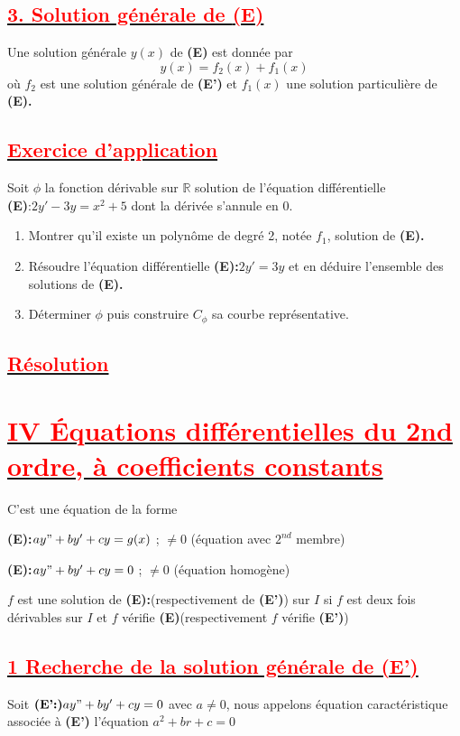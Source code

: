 \documentclass[12pt]{article}
\begin{document}
\subsection*{\underline{\textbf{\textcolor{red}{3. Solution générale de \textbf{(E)}}}}}
Une solution générale $y(x)$ de \textbf{(E)} est donnée par \[y(x)=f_{2}(x)+f_{1}(x)\] où $f_{2}$ est une solution générale de \textbf{(E')} et $f_{1}(x)$ une solution particulière de \textbf{(E).}
\subsection*{\underline{\textbf{\textcolor{red}{Exercice d'application}}}}
Soit $\phi$ la fonction dérivable sur $\mathbb{R}$ solution de l'équation différentielle\\
\textbf{(E)}:$2y'-3y=x^{2}+5$ dont la dérivée s'annule en 0.
\begin{enumerate}
    \item Montrer qu'il existe un polynôme de degré 2, notée $f_{1}$, solution de \textbf{(E).}
    \item Résoudre l'équation différentielle \textbf{(E):}$2y'=3y$ et en déduire l'ensemble des solutions de \textbf{(E).}
    \item Déterminer $\phi$ puis construire $C_{\phi}$ sa courbe représentative. 
\end{enumerate}
\subsection*{\underline{\textbf{\textcolor{red}{Résolution }}}}

\section*{\underline{\textbf{\textcolor{red}{IV Équations différentielles du 2nd ordre, à coefficients constants}}}}
C'est une équation de la forme

\textbf{(E):}$ay"+by'+cy=g(x)$ ; $\neq 0$ (équation avec $2^{nd}$ membre)

\textbf{(E):}$ay"+by'+cy=0$ ; $\neq 0$ (équation homogène)

$f$ est une solution de \textbf{(E):}(respectivement de \textbf{(E')}) sur $I$ si $f$ est deux fois dérivables sur $I$ et $f$ vérifie \textbf{(E)}(respectivement $f$ vérifie \textbf{(E')})
\subsection*{\underline{\textbf{\textcolor{red}{1 Recherche de la solution générale de (E')}}}}
Soit $\textbf{(E':)}ay"+by'+cy=0$ avec $a\neq 0$, nous appelons équation caractéristique associée à \textbf{(E')} l'équation $a^{2}+br+c=0$
\end{document}
